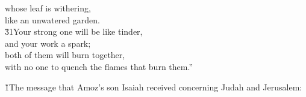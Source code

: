 \begin{poetry}
\poemll    whose leaf is withering, \\
\poemlll       like an unwatered garden. \\
\poeml \v{31}Your strong one will be like tinder, \\
\poemll    and your work a spark; \\
\poeml both of them will burn together, \\
\poemll    with no one to quench the flames that burn them.''
\end{poetry}

\v{1}The message that Amoz's son Isaiah received concerning Judah and Jerusalem:

